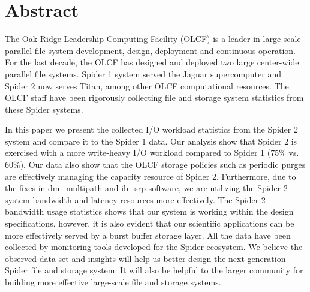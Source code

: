 \section*{Abstract}
\label{sec:abstract}

The Oak Ridge Leadership Computing Facility (OLCF) is a leader in large-scale
parallel file system development, design, deployment and continuous operation.
For the last decade, the OLCF has designed and deployed two large center-wide
parallel file systems. Spider 1 system served the Jaguar supercomputer and
Spider 2 now serves Titan, among other OLCF computational resources. The OLCF
staff have been rigorously collecting file and storage system statistics from
these Spider systems.

In this paper we present the collected I/O workload statistics from the Spider
2 system and compare it to the Spider 1 data. Our analysis show that Spider 2
is exercised with a more write-heavy I/O workload compared to Spider 1 (75\%
vs. 60\%). Our data also show that the OLCF storage policies such as periodic
purges are effectively managing the capacity resource of Spider 2.
Furthermore, due to the fixes in dm\_multipath and ib\_srp software, we are
utilizing the Spider 2 system bandwidth and latency resources more
effectively. The Spider 2 bandwidth usage statistics shows that our system is
working within the design specifications, however, it is also evident that our
scientific applications can be more effectively served by a burst buffer
storage layer. All the data have been collected by monitoring tools developed
for the Spider ecosystem. We believe the observed data set and insights will
help us better design the next-generation Spider file and storage system. It
will also be helpful to the larger community for building more effective
large-scale file and storage systems.

 
